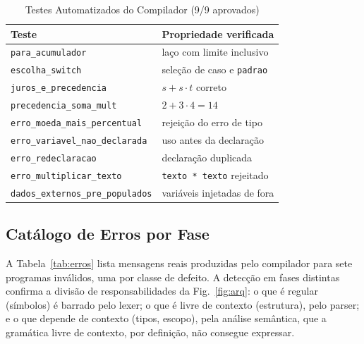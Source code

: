 \documentclass[conference]{IEEEtran}
\begin{document}
\begin{table}[!htbp]
\caption{Testes Automatizados do Compilador (9/9 aprovados)}
\label{tab:testes}
\centering
\footnotesize
\scriptsize\setlength{\tabcolsep}{3pt}\begin{tabular}{@{}p{}p{}@{}}
\toprule
\textbf{Teste} & \textbf{Propriedade verificada} \\
\midrule
\texttt{para\_acumulador} & laço com limite inclusivo \\
\texttt{escolha\_switch} & seleção de caso e \texttt{padrao} \\
\texttt{juros\_e\_precedencia} & $s + s \cdot t$ correto \\
\texttt{precedencia\_soma\_mult} & $2+3\cdot4 = 14$ \\
\texttt{erro\_moeda\_mais\_percentual} & rejeição do erro de tipo \\
\texttt{erro\_variavel\_nao\_declarada} & uso antes da declaração \\
\texttt{erro\_redeclaracao} & declaração duplicada \\
\texttt{erro\_multiplicar\_texto} & \texttt{texto * texto} rejeitado \\
\texttt{dados\_externos\_pre\_populados} & variáveis injetadas de fora \\
\bottomrule
\end{tabular}
\end{table}

\subsection{Catálogo de Erros por Fase}

A Tabela~\ref{tab:erros} lista mensagens reais produzidas pelo compilador para sete programas inválidos, uma por classe de defeito. A detecção em fases distintas confirma a divisão de responsabilidades da Fig.~\ref{fig:arq}: o que é regular (símbolos) é barrado pelo lexer; o que é livre de contexto (estrutura), pelo parser; e o que depende de contexto (tipos, escopo), pela análise semântica, que a gramática livre de contexto, por definição, não consegue expressar.
\end{document}
